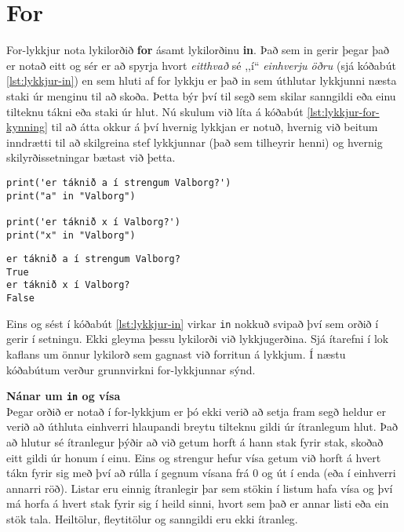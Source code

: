 \section{For}
For-lykkjur nota lykilorðið \textbf{for} ásamt lykilorðinu \textbf{in}.
Það sem in gerir þegar það er notað eitt og sér er að spyrja hvort \textit{eitthvað} sé ,,í“ \textit{einhverju öðru} (sjá kóðabút \ref{lst:lykkjur-in}) en sem hluti af for lykkju er það in sem úthlutar lykkjunni næsta staki úr menginu til að skoða.
Þetta býr því til segð sem skilar sanngildi eða einu tilteknu tákni eða staki úr hlut.
Nú skulum við líta á kóðabút \ref{lst:lykkjur-for-kynning} til að átta okkur á því hvernig lykkjan er notuð, hvernig við beitum inndrætti til að skilgreina stef lykkjunnar (það sem tilheyrir henni) og hvernig skilyrðissetningar bætast við þetta.

\begin{lstlisting}[caption=Lykilorðið in, label=lst:lykkjur-in]
print('er táknið a í strengum Valborg?')
print("a" in "Valborg")

print('er táknið x í Valborg?')
print("x" in "Valborg")
\end{lstlisting}
\lstset{style=uttak}
\begin{lstlisting}
er táknið a í strengum Valborg?
True
er táknið x í Valborg?
False
\end{lstlisting}
\lstset{style=venjulegt}

Eins og sést í kóðabút \ref{lst:lykkjur-in} virkar \texttt{in} nokkuð svipað því sem orðið í gerir í setningu.
Ekki gleyma þessu lykilorði við lykkjugerðina.
Sjá ítarefni í lok kaflans um önnur lykilorð sem gagnast við forritun á lykkjum.
Í næstu kóðabútum verður grunnvirkni for-lykkjunnar sýnd.
\vspace{1cm}
\begin{itarefni}
	\textbf{Nánar um \texttt{in} og vísa}\\
	Þegar orðið er notað í for-lykkjum er þó ekki verið að setja fram segð heldur er verið að úthluta einhverri hlaupandi breytu tilteknu gildi úr ítranlegum hlut.
	Það að hlutur sé ítranlegur þýðir að við getum horft á hann stak fyrir stak, skoðað eitt gildi úr honum í einu.
	Eins og strengur hefur vísa getum við horft á hvert tákn fyrir sig með því að rúlla í gegnum vísana frá 0 og út í enda (eða í einhverri annarri röð).
	Listar eru einnig ítranlegir þar sem stökin í listum hafa vísa og því má horfa á hvert stak fyrir sig í heild sinni, hvort sem það er annar listi eða ein stök tala.
	Heiltölur, fleytitölur og sanngildi eru ekki ítranleg.
\end{itarefni}


